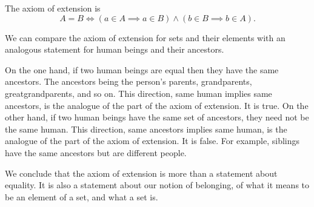 The axiom of extension is
\[
  A = B \Leftrightarrow (a \in A \implies a \in B) \land (b \in B \implies b \in A).
\]



We can compare the axiom of extension
for sets and their elements with an
analogous statement
for human beings and their ancestors.

On the one hand, if two human beings are equal then they have the same ancestors.
The ancestors being the person's parents, grandparents, greatgrandparents, and so on.
This direction, same human implies same ancestors, is the analogue of the  part of the axiom of extension.
It is true.
On the other hand, if two human beings have the same set of ancestors, they need not be the same human.
This direction, same ancestors implies same human, is the analogue of the  part of the axiom of extension.
It is false.
For example, siblings have the same ancestors but are different people.

We conclude that the axiom of extension
is more than a statement about equality.
It is also a statement about our notion of
belonging, of what it means
to be an element of a set, and what a set is.

\blankpage

